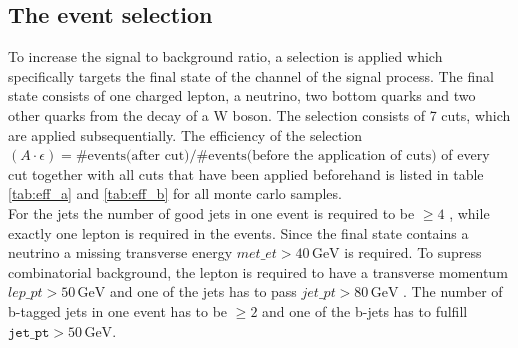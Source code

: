 \subsection{The event selection}
To increase the signal to background ratio, a selection is applied which specifically targets the final state of the 
channel of the signal process.
The final state consists of one charged lepton, a neutrino, two bottom quarks and two other quarks from the 
decay of a W boson. The selection consists of 7 cuts, which are applied subsequentially. 
The efficiency of the selection $(A \cdot \epsilon) = \# \text{events(after cut)} / \# \text{events(before the application of cuts)}$ of every cut together with all 
cuts that have been applied beforehand is listed in table \ref{tab:eff_a} and \ref{tab:eff_b} for all monte carlo samples.\\
For the jets the number of good jets in one event is required to be $\geq 4$ 
, while exactly one lepton is required 
in the events. Since the final state contains a neutrino 
a missing 
transverse energy $met\_et > 40 \, \si{\giga\eV}$ 
 is required. To supress combinatorial background, 
the lepton is required to have a transverse momentum $lep\_pt > 50 \, \si{\giga\eV}$ 
 and one of 
the jets has to pass $jet\_pt > 80 \, \si{\giga\eV}$ 
. The number of b-tagged jets in one event has to be 
$\geq 2$ 
 and one of the b-jets has to fulfill $\texttt{jet\_pt} > 50 \, \si{\giga\eV}$.%
